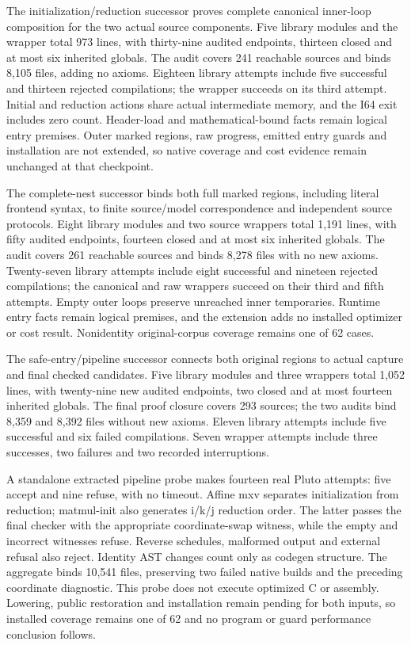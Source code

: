 The initialization/reduction successor proves complete canonical inner-loop
composition for the two actual source components. Five library modules and the
wrapper total 973 lines, with thirty-nine audited endpoints, thirteen closed
and at most six inherited globals. The audit covers 241 reachable sources and
binds 8,105 files, adding no axioms. Eighteen library attempts include five
successful and thirteen rejected compilations; the wrapper succeeds on its
third attempt. Initial and reduction actions share actual intermediate memory,
and the I64 exit includes zero count. Header-load and mathematical-bound facts
remain logical entry premises. Outer marked regions, raw progress, emitted
entry guards and installation are not extended, so native coverage and cost
evidence remain unchanged at that checkpoint.

The complete-nest successor binds both full marked regions, including literal
frontend syntax, to finite source/model correspondence and independent source
protocols. Eight library modules and two source wrappers total 1,191 lines,
with fifty audited endpoints, fourteen closed and at most six inherited
globals. The audit covers 261 reachable sources and binds 8,278 files with no
new axioms. Twenty-seven library attempts include eight successful and
nineteen rejected compilations; the canonical and raw wrappers succeed on
their third and fifth attempts. Empty outer loops preserve unreached inner
temporaries. Runtime entry facts remain logical premises, and the extension
adds no installed optimizer or cost result. Nonidentity original-corpus
coverage remains one of 62 cases.

The safe-entry/pipeline successor connects both original regions to actual
capture and final checked candidates. Five library modules and three wrappers
total 1,052 lines, with twenty-nine new audited endpoints, two closed and at
most fourteen inherited globals. The final proof closure covers 293 sources;
the two audits bind 8,359 and 8,392 files without new axioms. Eleven library
attempts include five successful and six failed compilations. Seven wrapper
attempts include three successes, two failures and two recorded interruptions.

A standalone extracted pipeline probe makes fourteen real Pluto attempts:
five accept and nine refuse, with no timeout. Affine mxv separates initialization
from reduction; matmul-init also generates i/k/j reduction order. The latter
passes the final checker with the appropriate coordinate-swap witness, while
the empty and incorrect witnesses refuse. Reverse schedules, malformed output
and external refusal also reject. Identity AST changes count only as codegen
structure. The aggregate binds 10,541 files, preserving two failed native builds
and the preceding coordinate diagnostic. This probe does not execute optimized
C or assembly. Lowering, public restoration and installation remain pending
for both inputs, so installed coverage remains one of 62 and no program or
guard performance conclusion follows.

